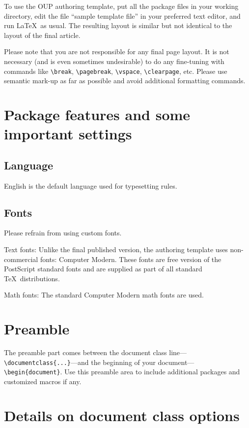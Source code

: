 \documentclass{article}
\begin{document}
To use the OUP authoring template, put all the package files in your
working directory, edit the file ``sample template file'' in your
preferred text editor, and run \LaTeX\ as usual. The resulting
layout is similar but not identical to the layout of the final
article.

Please note that you are not responsible for any final page layout. It is not necessary (and is even sometimes undesirable) to do any fine-tuning with commands like \verb+\break+, \verb+\pagebreak+, \verb+\vspace+, \verb+\clearpage+, etc. Please use semantic mark-up as far as possible and avoid additional formatting commands.

\vfill\eject

\section{Package features and some important settings}

\subsection{Language}
English is the default language used for typesetting rules.

\subsection{Fonts}
Please refrain from using custom fonts.

\medskip

\noindent Text fonts: Unlike the final published version, the authoring template uses non-commercial fonts: Computer Modern. These fonts are free version of the PostScript standard fonts and are supplied as part of all standard \TeX\ distributions.

\medskip

\noindent Math fonts: The standard Computer Modern math fonts are used.

\section{Preamble}
The preamble part comes between the document class line---\newline\verb+\documentclass{...}+---and the beginning of your document---\verb+\begin{document}+. Use this preamble area to include additional packages and customized macros if any.

\section{Details on document class options}
\end{document}
